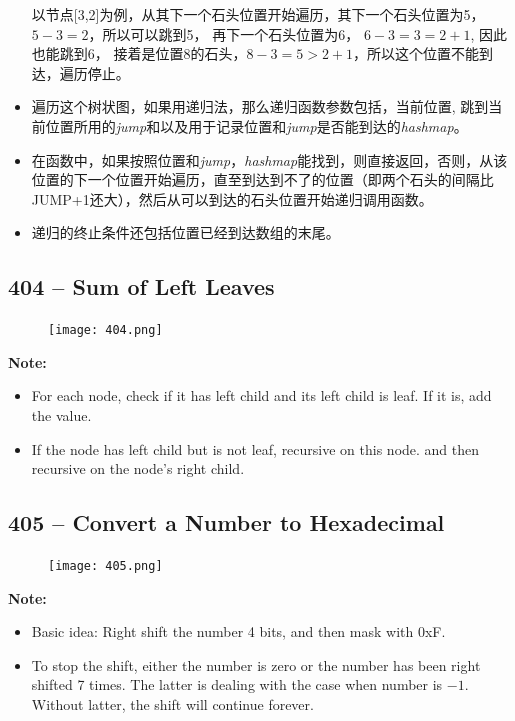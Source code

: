 \documentclass[a4paper,12pt]{article}
\begin{document}
\begin{CJK*}{UTF8}{gbsn}
\begin{itemize}
\begin{figure}[H]
\begin{center}
			\end{center}
		\end{figure}
		以节点[3,2]为例，从其下一个石头位置开始遍历，其下一个石头位置为5， $5-3=2$，所以可以跳到5， 再下一个石头位置为6， $6-3=3=2+1$, 因此也能跳到6， 接着是位置8的石头，$8-3=5>2+1$，所以这个位置不能到达，遍历停止。
		\item 遍历这个树状图，如果用递归法，那么递归函数参数包括，当前位置, 跳到当前位置所用的\textit{jump}和以及用于记录位置和\textit{jump}是否能到达的\textit{hashmap}。
		\item 在函数中，如果按照位置和\textit{jump}，\textit{hashmap}能找到，则直接返回，否则，从该位置的下一个位置开始遍历，直至到达到不了的位置（即两个石头的间隔比JUMP+1还大），然后从可以到达的石头位置开始递归调用函数。
		\item 递归的终止条件还包括位置已经到达数组的末尾。
	\end{itemize}
	\clearpage
\end{CJK*}

\subsection{404 -- Sum of Left Leaves}
\begin{figure}[H]
	\begin{center}
		\texttt{[image: 404.png]}
	\end{center}
\end{figure}
\textbf{\large{Note:}}
\begin{itemize}
	\item For each node, check if it has left child and its left child is leaf. If it is, add the value.
	\item If the node has left child but is not leaf, recursive on this node. and then recursive on the node's right child.
\end{itemize}

\subsection{405 -- Convert a Number to Hexadecimal}
\begin{figure}[H]
	\begin{center}
		\texttt{[image: 405.png]}
	\end{center}
\end{figure}
\textbf{\large{Note:}}
\begin{itemize}
	\item Basic idea: Right shift the number 4 bits, and then mask with 0xF. 
	\item To stop the shift, either the number is zero or the number has been right shifted 7 times. The latter is dealing with the case when number is $-1$. Without latter, the shift will continue forever.
\end{itemize}
\end{document}
